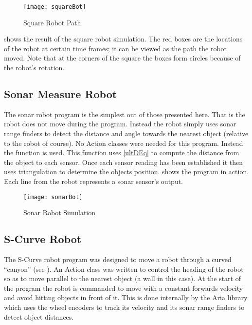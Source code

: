 \documentclass[main.tex]{subfiles}
\begin{document}
\begin{figure}[H]
	\begin{center}
	\texttt{[image: squareBot]}
	\end{center}
	\caption{Square Robot Path}
	\label{fig:sqBotPath}
\end{figure}

 shows the result of the square robot simulation. The red
boxes are the locations of the robot at certain time frames; it can be viewed as
the path the robot moved. Note that at the corners of the square the boxes form
circles because of the robot's rotation.

\subsection{Sonar Measure Robot} 

The sonar robot program is the simplest out of
those presented here. That is the robot does not move during the program.
Instead the robot simply uses sonar range finders to detect the distance and
angle towards the nearest object (relative to the robot of course). No Action
classes were needed for this program. Instead the  function
 is used.  This function uses
\eqref{ultDEq} to compute the distance from the object to each sensor. Once each
sensor reading has been established it then uses triangulation to determine the
objects position.  shows the program in action. Each line from
the robot represents a sonar sensor's output.

\begin{figure}[H]
\begin{center}
\texttt{[image: sonarBot]}
\end{center}
\caption{Sonar Robot Simulation}
\label{fig:sonarSim}
\end{figure}

\subsection{S-Curve Robot}

The S-Curve robot program was designed to move a robot through a curved
``canyon'' (see ). An Action class was written to control the
heading of the robot so as to move parallel to the nearest object (a wall in
this case). At the start of the program the robot is commanded to move with a
constant forwards velocity and avoid hitting objects in front of it. This is
done internally by the Aria library which uses the wheel encoders to track its
velocity and its sonar range finders to detect object distances.
\end{document}
